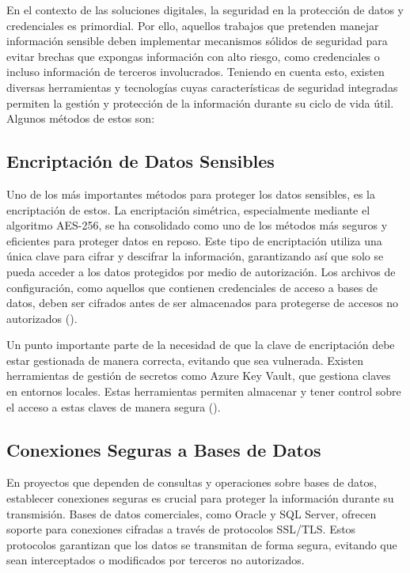 \documentclass[letter,oneside,12pt,spanish]{report}
\begin{document}
\noindent En el contexto de las soluciones digitales, la seguridad en la protección de datos y credenciales es primordial. Por ello, aquellos trabajos que pretenden manejar información sensible deben implementar mecanismos sólidos de seguridad para evitar brechas que expongas información con alto riesgo, como credenciales o incluso información de terceros involucrados. Teniendo en cuenta esto, existen diversas herramientas y tecnologías cuyas características de seguridad integradas permiten la gestión y protección de la información durante su ciclo de vida útil. Algunos métodos de estos son:

\subsection{Encriptación de Datos Sensibles}

\noindent Uno de los más importantes métodos para proteger los datos sensibles, es la encriptación de estos. La encriptación simétrica, especialmente mediante el algoritmo AES-256, se ha consolidado como uno de los métodos más seguros y eficientes para proteger datos en reposo. Este tipo de encriptación utiliza una única clave para cifrar y descifrar la información, garantizando así que solo se pueda acceder a los datos protegidos por medio de autorización. Los archivos de configuración, como aquellos que contienen credenciales de acceso a bases de datos, deben ser cifrados antes de ser almacenados para protegerse de accesos no autorizados (\cite{cryptography2024fernet}).

\noindent Un punto importante parte de la necesidad de que la clave de encriptación debe estar gestionada de manera correcta, evitando que sea vulnerada. Existen herramientas de gestión de secretos como Azure Key Vault, que gestiona claves en entornos locales. Estas herramientas permiten almacenar y tener control sobre el acceso a estas claves de manera segura (\cite{microsoft2024keyvault}).

\subsection{Conexiones Seguras a Bases de Datos}

\noindent En proyectos que dependen de consultas y operaciones sobre bases de datos, establecer conexiones seguras es crucial para proteger la información durante su transmisión. Bases de datos comerciales, como Oracle y SQL Server, ofrecen soporte para conexiones cifradas a través de protocolos SSL/TLS. Estos protocolos garantizan que los datos se transmitan de forma segura, evitando que sean interceptados o modificados por terceros no autorizados.
\end{document}
